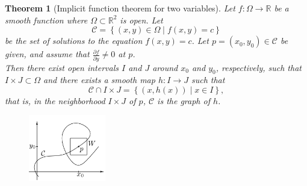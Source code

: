 \documentclass[reqno]{amsart}
\theoremstyle{plain}%
\newtheorem{theorem}{Theorem}[section]
\theoremstyle{definition}
\theoremstyle{remark}
\begin{document}
\begin{theorem}[Implicit function theorem for two
    variables]\label{implicit-function-two-var}
    Let $f  \colon \Omega \to \mathbb{R}$ be a smooth function where
    $\Omega \subset \mathbb{R}^2$ is open. Let
    \[
    \mathcal{C} = \left\{ \left( x,y \right) \in \Omega
     \mid  f(x,y) = c \right\} 
    \] 
    be the set of solutions to the equation
    $f(x,y) = c$. Let $p = \left( x_0,y_0 \right) 
    \in \mathcal{C}$ be given, and assume that
    $\frac{\partial f}{\partial y}\neq 0$ at $p$.\\
    Then there exist open intervals $I$ and $J$ around $x_0$ and $y_0$,
    respectively, such that $I \times J \subset \Omega$ and
    there exists a smooth map $h  \colon I \to J$ such that
    \[
    \mathcal{C} \cap I \times J = \left\{ \left( x, h(x) \right)  \mid x \in I \right\}
    ,\label{eq:implicit-function-theorem}\tag{$\omega$}
    \] 
    that is, in the neighborhood $I \times J$ of $p$, $\mathcal{C}$ is the graph of $h$.
\end{theorem}

\begin{figure}[H]
    \centering
    \includegraphics[width=0.3\textwidth]{implicit-function-thm-two}
    \label{fig:implicit-function-thm-two}
\end{figure}
\end{document}
